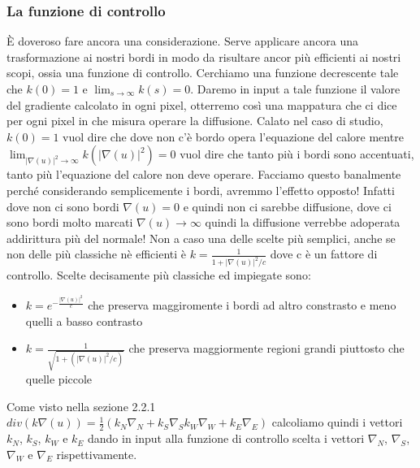 \subsubsection{La funzione di controllo}
\`E doveroso fare ancora una considerazione. Serve applicare ancora una trasformazione ai nostri bordi in modo da risultare ancor più efficienti ai nostri scopi, ossia una funzione di controllo. Cerchiamo una funzione decrescente tale che $k(0)=1$ e $\lim_{s\to\infty}k(s)=0$. Daremo in input a tale funzione il valore del gradiente calcolato in ogni pixel, otterremo così una mappatura che ci dice per ogni pixel in che misura operare la diffusione. Calato nel caso di studio, $k(0)=1$ vuol dire che dove non c'è bordo opera l'equazione del calore mentre $\lim_{|\nabla(u)|^2\to\infty}k(|\nabla(u)|^2)=0$ vuol dire che tanto più i bordi sono accentuati, tanto più l'equazione del calore non deve operare.
Facciamo questo banalmente perché considerando semplicemente i bordi, avremmo l'effetto opposto! Infatti dove non ci sono bordi $\nabla(u)=0$ e quindi non ci sarebbe diffusione, dove ci sono bordi molto marcati $\nabla(u)\to\infty$ quindi la diffusione verrebbe adoperata addirittura più del normale!
Non a caso una delle scelte più semplici, anche se non delle più classiche nè efficienti è $k=\frac{1}{1+|\nabla(u)|^2/c}$ dove c è un fattore di controllo.
Scelte decisamente più classiche ed impiegate sono:
\begin{itemize}
    \item $k=e^{-\frac{|\nabla(u)|^2}{c}}$ che preserva maggiromente i bordi ad altro constrasto e meno quelli a basso contrasto
    \item $k=\frac{1}{\sqrt{1+(|\nabla(u)|^2/c)}}$ che preserva maggiormente regioni grandi piuttosto che quelle piccole
\end{itemize} 
Come visto nella sezione 2.2.1 $div(k\nabla(u))=\frac{1}{2}(k_N\nabla_N + k_S\nabla_S k_W\nabla_W + k_E\nabla_E)$ calcoliamo quindi i vettori $k_N$, $k_S$, $k_W$ e $k_E$ dando in input alla funzione di controllo scelta i vettori $\nabla_N$, $\nabla_S$, $\nabla_W$ e $\nabla_E$ rispettivamente.

\newpage
